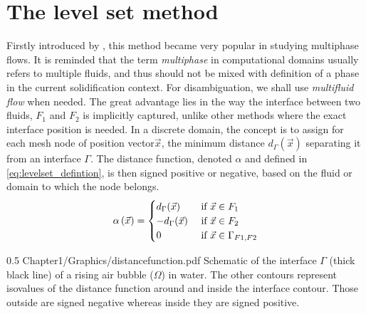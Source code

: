 \section{The level set method}
Firstly introduced by \citet{osher_fronts_1988}, this method became very popular in studying multiphase flows.
It is reminded that the term \emph{multiphase} in computational domains usually refers to multiple fluids, and thus
should not be mixed with definition of a phase in the current solidification context. For disambiguation, we shall
use \emph{multifluid flow} when needed.
The great advantage lies in the way the interface between two fluids, $F_1$ and $F_2$ is implicitly captured, unlike 
other methods where the exact interface position is needed. In a discrete domain, the concept is to assign for each 
mesh node of position vector$\vec{x}$, the minimum distance $d_\Gamma(\vec{x})$ separating it from an interface $\Gamma$. 
The distance function, denoted $\alpha$ and defined in \cref{eq:levelset_defintion}, is then signed positive or negative, based on the fluid or domain 
to which the node belongs.
\begin{align}
\label{eq:levelset_defintion}
\alpha \left( \vec{x} \right) = 
\begin{cases}
  d_\Gamma(\vec{x}) 		& \text{ if } \vec{x} \in F_1 \\ 
 -d_\Gamma(\vec{x})			& \text{ if } \vec{x} \in F_2 \\ 
  0 						& \text{ if } \vec{x} \in \Gamma_{F1, F2} 
\end{cases}
\end{align}
\begin{figureth}
{0.5}
{Chapter1/Graphics/distancefunction.pdf}
{Schematic of the interface $\Gamma$ (thick black line) of a rising air bubble ($\Omega$) in water. The other contours represent isovalues
of the distance function around and inside the interface contour. Those outside are signed negative whereas inside they are signed
positive.}
\label{fig:distance_function}
\end{figureth}
%
